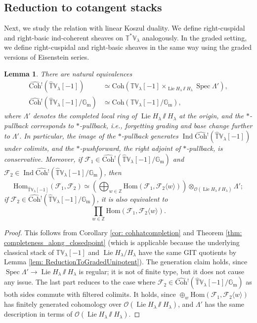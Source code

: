 \documentclass{amsart}
\newtheorem{lemma}[theorem]{Lemma}
\theoremstyle{definition}
\theoremstyle{remark}
\numberwithin{equation}{section}
\DeclareMathOperator{\Lie}{Lie}
\DeclareMathOperator{\Spec}{Spec}
\DeclareMathOperator{\Ind}{Ind}
\newcommand{\mc}{\mathcal}
\newcommand{\Z}{\mathbb{Z}}
\newcommand{\Gm}{{\mathbb{G}_{\mathrm{m}}}}
\newcommand{\Hom}{\mathrm{Hom}}
\newcommand{\wh}{\widehat}
\newcommand{\Coh}{\mathrm{Coh}}
\newcommand{\V}{\mathbb{V}}
\newcommand{\T}{\mathbb{T}}
\begin{document}
\subsection{Reduction to cotangent stacks}\label{ss: reductiontocotangent}
Next, we study the relation with linear Koszul duality. 
We define right-cuspidal and right-basic ind-coherent sheaves on $\T^* \V_\lambda$ analogously. 
In the graded setting, we define right-cuspidal and right-basic sheaves in the same way using the graded versions of Eisenstein series. 

\begin{lemma}\label{lem: HatCohForgettingGm}
There are natural equivalences
\begin{align*}
\wh{\Coh}{}^! (\wh{\T}\V_\lambda[-1]) &\simeq \Coh(\T\V_\lambda[-1] \times_{\Lie H_\lambda \sslash H_\lambda} \Spec \Lambda'), \\
\wh{\Coh}{}^! (\wh{\T}\V_\lambda[-1] /\Gm) &\simeq \Coh(\T\V_\lambda[-1] /\Gm),
\end{align*}
where $\Lambda'$ denotes the completed local ring of $\Lie H_\lambda \sslash H_\lambda$ at the origin, and the $*$-pullback corresponds to $*$-pullback, i.e., forgetting grading and base change further to $\Lambda'$. In particular, the image of the $*$-pullback generates  $\Ind\wh{\Coh}{}^! (\wh{\T}\V_\lambda[-1])$ under colimits, and the $*$-pushforward, the right adjoint of $*$-pullback, is conservative. Moreover, if $\mc F_1\in \wh{\Coh}{}^!(\wh{\T}\V_\lambda[-1]/\Gm)$ and $\mc F_2\in \Ind\wh{\Coh}{}^!(\wh{\T}\V_\lambda[-1]/\Gm)$, then
\[
\Hom_{\wh{\T}\V_\lambda[-1]}(\mc F_1, \mc F_2)\simeq (\bigoplus_{w\in \Z} \Hom(\mc F_1, \mc F_2 \langle w \rangle))\otimes_{\mc O(\Lie H_\lambda \sslash H_\lambda)}\Lambda';
\]
if $\mc F_2\in \wh{\Coh}{}^!(\wh{\T}\V_\lambda[-1]/\Gm)$, it is also equivalent to
\[
\prod_{w\in \Z} \Hom(\mc F_1, \mc F_2 \langle w \rangle).
\]
\end{lemma}

\begin{proof}
This follows from Corollary \ref{cor: cohhatcompletion} and Theorem \ref{thm: completeness_along_closedpoint} (which is applicable because the underlying classical stack of $\T\V_\lambda[-1]$ and $\Lie H_\lambda /H_\lambda$ have the same GIT quotients by Lemma \ref{lem: ReductionToGradedUnipotent}). The generation claim holds, since $\Spec \Lambda'\to \Lie H_\lambda \sslash H_\lambda$ is regular; it is not of finite type, but it does not cause any issue. The last part reduces to the case where $\mc F_2\in \wh{\Coh}{}^!(\wh{\T}\V_\lambda[-1]/\Gm)$ as both sides commute with filtered colimits. It holds, since $\oplus_w\Hom(\mc F_1, \mc F_2\langle w\rangle)$ has finitely generated cohomology over $\mc O(\Lie H_\lambda \sslash H_\lambda)$, and $\Lambda'$ has the same description in terms of $\mc O(\Lie H_\lambda \sslash H_\lambda)$. 
\end{proof}
\end{document}
